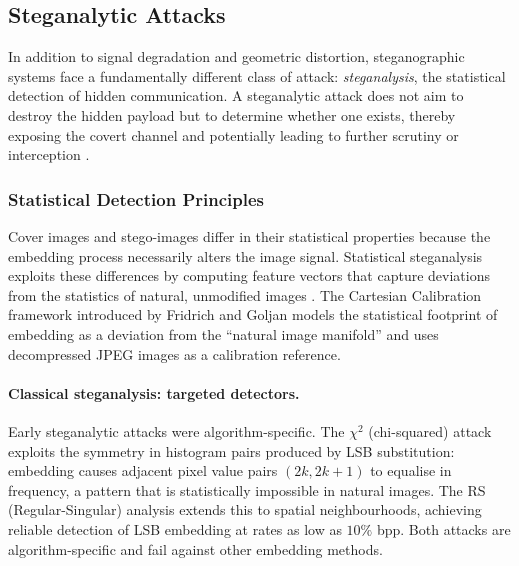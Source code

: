 \documentclass[12pt,a4paper,oneside]{report}
\begin{document}
	\subsection{Steganalytic Attacks}
	\label{subsec:attack_steganalysis}
	
	In addition to signal degradation and geometric distortion, steganographic systems face a
	fundamentally different class of attack: \emph{steganalysis}, the statistical detection of
	hidden communication. A steganalytic attack does not aim to destroy the hidden payload but to
	determine whether one exists, thereby exposing the covert channel and potentially leading to
	further scrutiny or interception \cite{Fridrich2012}.
	
	\subsubsection{Statistical Detection Principles}
	
	Cover images and stego-images differ in their statistical properties because the embedding
	process necessarily alters the image signal. Statistical steganalysis exploits these differences
	by computing feature vectors that capture deviations from the statistics of natural, unmodified
	images \cite{Fridrich2012}. The Cartesian Calibration framework introduced by Fridrich and
	Goljan \cite{fridrich2009steganography} models the statistical footprint of embedding as a deviation
	from the ``natural image manifold'' and uses decompressed JPEG images as a calibration reference.
	
	\paragraph{Classical steganalysis: targeted detectors.}
	Early steganalytic attacks were algorithm-specific. The $\chi^2$ (chi-squared) attack
	\cite{westfeld2001f5} exploits the symmetry in histogram pairs produced by LSB substitution:
	embedding causes adjacent pixel value pairs $(2k, 2k+1)$ to equalise in frequency, a pattern
	that is statistically impossible in natural images. The RS (Regular-Singular) analysis
	\cite{provos2003hide} extends this to spatial neighbourhoods, achieving reliable detection
	of LSB embedding at rates as low as $10\%$ bpp. Both attacks are algorithm-specific and fail
	against other embedding methods.
	
\end{document}
